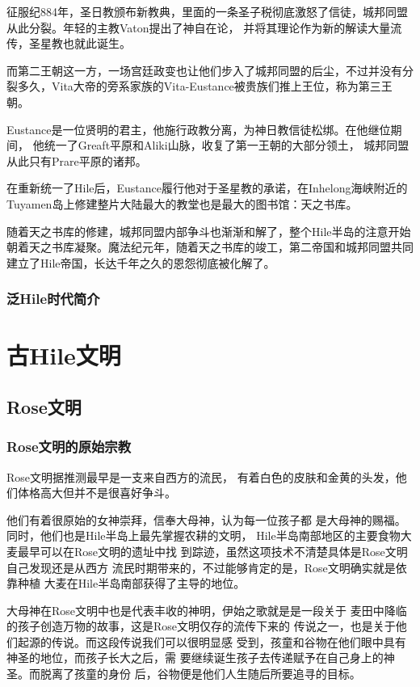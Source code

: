 \documentclass[UTF8,12pt]{ctexbook}
\begin{document}
        征服纪884年，圣日教颁布新教典，里面的一条圣子税彻底激怒了信徒，城邦同盟从此分裂。年轻的主教Vaton提出了神自在论，
        并将其理论作为新的解读大量流传，圣星教也就此诞生。

        而第二王朝这一方，一场宫廷政变也让他们步入了城邦同盟的后尘，不过并没有分裂多久，Vita大帝的旁系家族的Vita-Eustance被贵族们推上王位，称为第三王朝。

        Eustance是一位贤明的君主，他施行政教分离，为神日教信徒松绑。在他继位期间，
        他统一了Greaft平原和Aliki山脉，收复了第一王朝的大部分领土，
        城邦同盟从此只有Prare平原的诸邦。

        在重新统一了Hile后，Eustance履行他对于圣星教的承诺，在Inhelong海峡附近的Tuyamen岛上修建整片大陆最大的教堂也是最大的图书馆：天之书库。

        随着天之书库的修建，城邦同盟内部争斗也渐渐和解了，整个Hile半岛的注意开始朝着天之书库凝聚。魔法纪元年，随着天之书库的竣工，第二帝国和城邦同盟共同建立了Hile帝国，长达千年之久的恩怨彻底被化解了。





    \section{泛Hile时代简介}
\part{古Hile文明}
    \chapter{Rose文明}
        \section{Rose文明的原始宗教}
            Rose文明据推测最早是一支来自西方的流民，
            有着白色的皮肤和金黄的头发，他们体格高大但并不是很喜好争斗。

            他们有着很原始的女神崇拜，信奉大母神，认为每一位孩子都
            是大母神的赐福。同时，他们也是Hile半岛上最先掌握农耕的文明，
            Hile半岛南部地区的主要食物大麦最早可以在Rose文明的遗址中找
            到踪迹，虽然这项技术不清楚具体是Rose文明自己发现还是从西方
            流民时期带来的，不过能够肯定的是，Rose文明确实就是依靠种植
            大麦在Hile半岛南部获得了主导的地位。

            大母神在Rose文明中也是代表丰收的神明，伊始之歌就是是一段关于
            麦田中降临的孩子创造万物的故事，这是Rose文明仅存的流传下来的
            传说之一，也是关于他们起源的传说。而这段传说我们可以很明显感
            受到，孩童和谷物在他们眼中具有神圣的地位，而孩子长大之后，需
            要继续诞生孩子去传递赋予在自己身上的神圣。而脱离了孩童的身份
            后，谷物便是他们人生随后所要追寻的目标。
\end{document}
